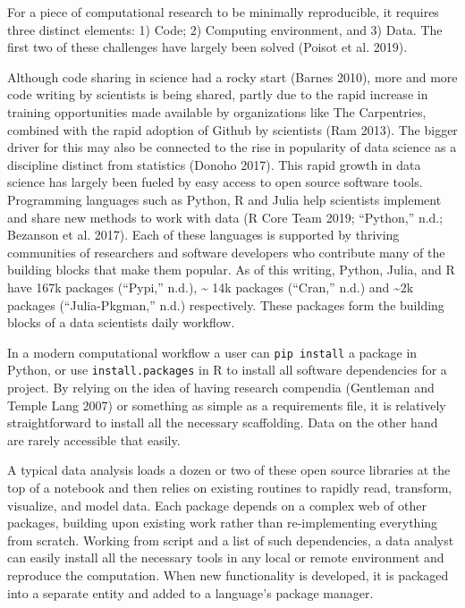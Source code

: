 \documentclass[
]{article}
\begin{document}
For a piece of computational research to be minimally reproducible, it requires three distinct elements: 1) Code; 2) Computing environment, and 3) Data. The first two of these challenges have largely been solved (Poisot et al. 2019).

Although code sharing in science had a rocky start (Barnes 2010), more and more code writing by scientists is being shared, partly due to the rapid increase in training opportunities made available by organizations like The Carpentries, combined with the rapid adoption of Github by scientists (Ram 2013). The bigger driver for this may also be connected to the rise in popularity of data science as a discipline distinct from statistics (Donoho 2017). This rapid growth in data science has largely been fueled by easy access to open source software tools. Programming languages such as Python, R and Julia help scientists implement and share new methods to work with data (R Core Team 2019; ``Python,'' n.d.; Bezanson et al. 2017). Each of these languages is supported by thriving communities of researchers and software developers who contribute many of the building blocks that make them popular. As of this writing, Python, Julia, and R have 167k packages (``Pypi,'' n.d.), \textasciitilde{} 14k packages (``Cran,'' n.d.) and \textasciitilde2k packages (``Julia-Pkgman,'' n.d.) respectively. These packages form the building blocks of a data scientists daily workflow.

In a modern computational workflow a user can \texttt{pip\ install} a package in Python, or use \texttt{install.packages} in R to install all software dependencies for a project. By relying on the idea of having research compendia (Gentleman and Temple Lang 2007) or something as simple as a requirements file, it is relatively straightforward to install all the necessary scaffolding. Data on the other hand are rarely accessible that easily.

A typical data analysis loads a dozen or two of these open source libraries at the top of a notebook and then relies on existing routines to rapidly read, transform, visualize, and model data. Each package depends on a complex web of other packages, building upon existing work rather than re-implementing everything from scratch. Working from script and a list of such dependencies, a data analyst can easily install all the necessary tools in any local or remote environment and reproduce the computation. When new functionality is developed, it is packaged into a separate entity and added to a language's package manager.
\end{document}
